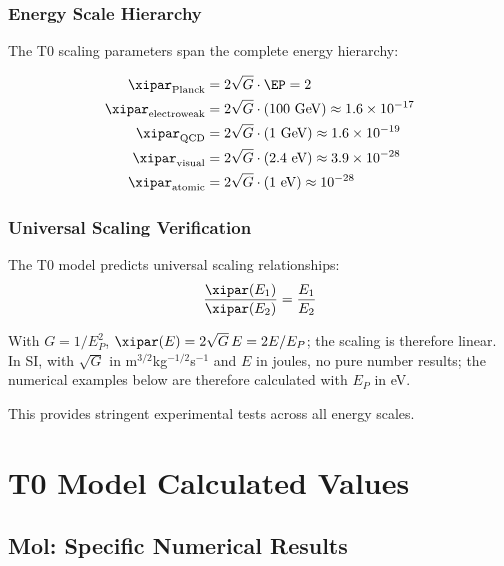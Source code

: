 	\subsubsection{Energy Scale Hierarchy}
	\label{subsubsec:energy_scale_hierarchy}
	
	The T0 scaling parameters span the complete energy hierarchy:
	
	\begin{align}
		\xipar_{\text{Planck}} &= 2\sqrt{G} \cdot \EP = 2 \\
		\xipar_{\text{electroweak}} &= 2\sqrt{G} \cdot (100 \text{ GeV}) \approx 1.6 \times 10^{-17} \\
		\xipar_{\text{QCD}} &= 2\sqrt{G} \cdot (1 \text{ GeV}) \approx 1.6 \times 10^{-19} \\
		\xipar_{\text{visual}} &= 2\sqrt{G} \cdot (2.4 \text{ eV}) \approx 3.9 \times 10^{-28} \\
		\xipar_{\text{atomic}} &= 2\sqrt{G} \cdot (1 \text{ eV}) \approx 10^{-28}
	\end{align}
	
	\subsubsection{Universal Scaling Verification}
	\label{subsubsec:universal_scaling_verification}
	
	The T0 model predicts universal scaling relationships:
	\begin{equation}
		\frac{\xipar(E_1)}{\xipar(E_2)} = \frac{E_1}{E_2}
		\label{eq:universal_scaling_test}
	\end{equation}
	
	With $G = 1/E_P^2$, $\xipar(E) = 2\sqrt{G}\,E = 2E/E_P$; the scaling is therefore linear. In SI, with $\sqrt{G}$ in m$^{3/2}$kg$^{-1/2}$s$^{-1}$ and $E$ in joules, no pure number results; the numerical examples below are therefore calculated with $E_P$ in eV.
	
	This provides stringent experimental tests across all energy scales.
	
	\section{T0 Model Calculated Values}
	\label{sec:t0_calculated_values}
	
	\subsection{Mol: Specific Numerical Results}
	\label{subsec:mol_numerical_results}
	
